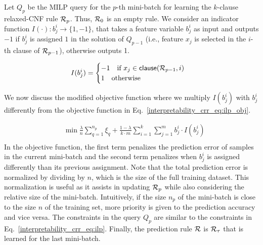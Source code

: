 Let  $ Q_p $ be the MILP query for the $ p $-th mini-batch for learning the $ k $-clause relaxed-CNF rule $ {\mathcal{R}}_p $. Thus, $ {\mathcal{R}}_0 $ is an empty rule.
We consider an indicator function $ I(\cdot): b^i_j \rightarrow \{1,-1\} $, that takes a feature variable $ b^i_j $ as input and outputs $ -1 $  if $ b^i_j $ is assigned $ 1 $ in the solution of $ Q_{p-1} $ (i.e., feature $ x_j $ is selected in the $ i $-th clause of   $ {\mathcal{R}}_{p-1} $), otherwise outputs 1.

\[
I(b^i_j)=
\begin{cases}
-1 \quad \text{if }  x_j \in \mathsf{clause}({\mathcal{R}}_{p-1},i)
\\
1 \quad \text{otherwise}
\end{cases}
\]

We now discuss the modified objective function where we multiply $ I(b^i_j) $ with $ b^i_j $ differently  from the objective function in Eq.~\ref{interpretability_crr_eq:ilp_obj}.

\begin{equation}
\label{interpretability_crr_eq:ilp_inc}
	\begin{split}
	&\min  \frac{\lambda}{n} \sum_{q=1}^{n_p} \xi_q  +  \frac{1-\lambda}{k\cdot m} \sum_{i=1}^k\sum_{j=1}^m b_j^i \cdot I(b^i_j) \\
	\end{split}
\end{equation}
In the objective function, the first term penalizes the prediction error of samples in the current mini-batch and the second term penalizes when $ b_j^i $ is assigned differently than its previous  assignment. Note that the total prediction error is normalized by dividing by $ n $, which is the size of the full training dataset. This normalization is useful as it assists in updating $ {\mathcal{R}}_p $ while also considering the relative size of the mini-batch. Intuitively, if the size $ n_p $ of the mini-batch  is close to the size $ n $
of the training set, more priority is given to the prediction accuracy and vice versa. The constraints in the  query $ Q_p $ are similar to the constraints in Eq.~\ref{interpretability_crr_eq:ilp}.  
Finally, the prediction rule  $ {\mathcal{R}} $ is  $ {\mathcal{R}}_\tau $ that is learned for the last mini-batch. 






